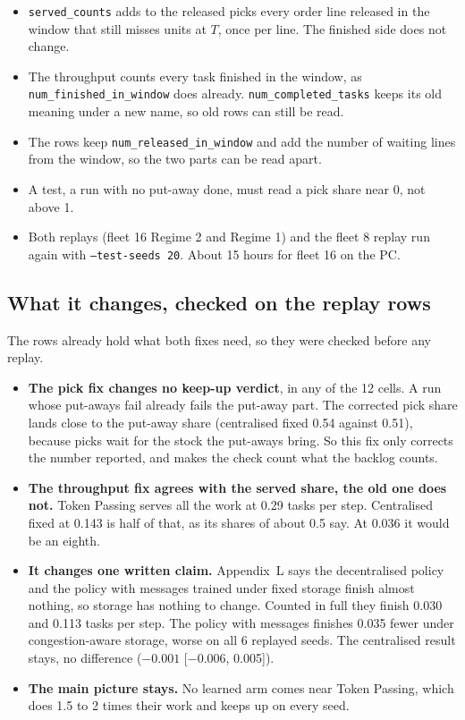 \documentclass[11pt,a4paper]{article}
\begin{document}
\begin{itemize}[leftmargin=1.2em]
\item \texttt{served\_counts} adds to the released picks every order line released in the window
  that still misses units at $T$, once per line. The finished side does not change.
\item The throughput counts every task finished in the window, as \texttt{num\_finished\_in\_window}
  does already. \texttt{num\_completed\_tasks} keeps its old meaning under a new name, so old rows
  can still be read.
\item The rows keep \texttt{num\_released\_in\_window} and add the number of waiting lines from the
  window, so the two parts can be read apart.
\item A test, a run with no put-away done, must read a pick share near 0, not above 1.
\item Both replays (fleet 16 Regime 2 and Regime 1) and the fleet 8 replay run again with
  \texttt{--test-seeds 20}. About 15 hours for fleet 16 on the PC.
\end{itemize}

\subsection*{What it changes, checked on the replay rows}

The rows already hold what both fixes need, so they were checked before any replay.

\begin{itemize}[leftmargin=1.2em]
\item \textbf{The pick fix changes no keep-up verdict}, in any of the 12 cells. A run whose put-aways
  fail already fails the put-away part. The corrected pick share lands close to the put-away share
  (centralised fixed 0.54 against 0.51), because picks wait for the stock the put-aways bring. So
  this fix only corrects the number reported, and makes the check count what the backlog counts.
\item \textbf{The throughput fix agrees with the served share, the old one does not.} Token Passing
  serves all the work at 0.29 tasks per step. Centralised fixed at 0.143 is half of that, as its
  shares of about 0.5 say. At 0.036 it would be an eighth.
\item \textbf{It changes one written claim.} Appendix~L says the decentralised policy and the policy
  with messages trained under fixed storage finish almost nothing, so storage has nothing to change.
  Counted in full they finish 0.030 and 0.113 tasks per step. The policy with messages finishes
  0.035 fewer under congestion-aware storage, worse on all 6 replayed seeds. The centralised result
  stays, no difference ($-0.001$ [$-0.006$, 0.005]).
\item \textbf{The main picture stays.} No learned arm comes near Token Passing, which does 1.5 to 2
  times their work and keeps up on every seed.
\end{itemize}
\end{document}
